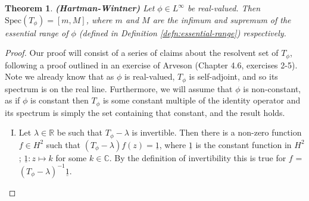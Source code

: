 \documentclass{article}
\newcommand{\Spec}{\text{Spec}}
\newcommand{\1}{\mathbf{1}}
\newtheorem{theorem}{Theorem}[section]
\begin{document}
\begin{theorem}{\textbf{(Hartman-Wintner)}}
Let $\phi \in L^\infty$ be real-valued. Then $\Spec(T_\phi) = [m, M]$, where $m$ and $M$ are the infimum and supremum of the essential range of $\phi$ (defined in Definition \ref{defn:essential-range}) respectively.
\end{theorem}
\begin{proof}
Our proof will consist of a series of claims about the resolvent set of $T_\phi$, following a proof outlined in an exercise of Arveson \parencite{arveson2002short} (Chapter 4.6, exercises 2-5). 
Note we already know that as $\phi$ is real-valued, $T_\phi$ is self-adjoint, and so its spectrum is on the real line. 
Furthermore, we will assume that $\phi$ is non-constant, as if $\phi$ is constant then $T_\phi$ is some constant multiple of the identity operator
and its spectrum is simply the set containing that constant, and the result holds.
\begin{enumerate}[I.]
\item Let $\lambda \in \mathbb{R}$ be such that $T_\phi - \lambda$ is invertible. Then there is a non-zero function $f \in H^2$ such that $(T_\phi - \lambda)f(z) = \underline{1}$, where
$\underline{1}$ is the constant function in $H^2$; $\underline{1} : z \mapsto k$ for some $k \in \mathbb{C}.$ By the definition of invertibility this is true for $f$ = $(T_\phi - \lambda)^{-1}\underline{1}$.


\end{enumerate}
\end{proof}
\end{document}
